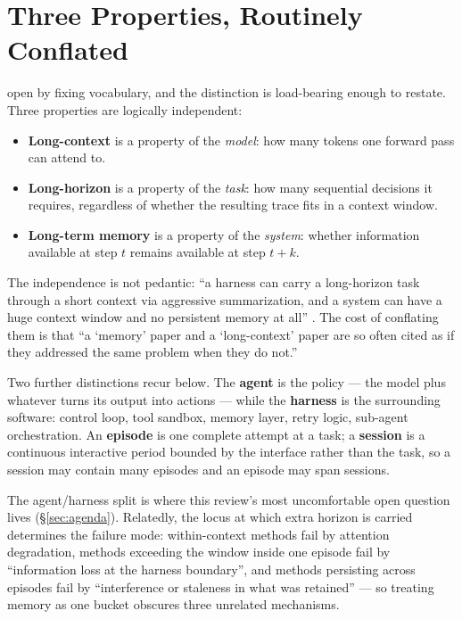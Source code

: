\documentclass[10pt,twocolumn,a4paper]{article}
\begin{document}
\section{Three Properties, Routinely Conflated}
\label{sec:terms}

\citet{chen2026horizongapplanningmemory} open by fixing vocabulary, and the distinction is
load-bearing enough to restate.
Three properties are logically independent:

\begin{itemize}
\item \textbf{Long-context} is a property of the \emph{model}: how many tokens one forward
      pass can attend to.
\item \textbf{Long-horizon} is a property of the \emph{task}: how many sequential decisions
      it requires, regardless of whether the resulting trace fits in a context window.
\item \textbf{Long-term memory} is a property of the \emph{system}: whether information
      available at step $t$ remains available at step $t+k$.
\end{itemize}

The independence is not pedantic: ``a harness can carry a long-horizon task through a
short context via aggressive summarization, and a system can have a huge context window
and no persistent memory at all''
\citep{chen2026horizongapplanningmemory}.
The cost of conflating them is that ``a `memory' paper and a `long-context' paper are so
often cited as if they addressed the same problem when they do not.''

Two further distinctions recur below.
The \textbf{agent} is the policy --- the model plus whatever turns its output into actions
--- while the \textbf{harness} is the surrounding software: control loop, tool sandbox,
memory layer, retry logic, sub-agent orchestration.
An \textbf{episode} is one complete attempt at a task; a \textbf{session} is a continuous
interactive period bounded by the interface rather than the task, so a session may contain
many episodes and an episode may span sessions.

The agent/harness split is where this review's most uncomfortable open question lives
(\S\ref{sec:agenda}).
Relatedly, the locus at which extra horizon is carried determines the failure mode:
within-context methods fail by attention degradation, methods exceeding the window inside
one episode fail by ``information loss at the harness boundary'', and methods persisting
across episodes fail by ``interference or staleness in what was retained''
\citep{chen2026horizongapplanningmemory} --- so treating memory as one bucket obscures three
unrelated mechanisms.
\end{document}
